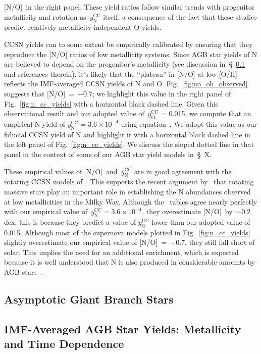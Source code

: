 \documentclass[ms.tex]{subfiles}
\begin{document}
[N/O]\subcc~in the right panel.
These yield ratios follow similar trends with progenitor metallicity and
rotation as~$y_\text{N}^\text{CC}$ itself, a consequence of the fact that these
studies predict relatively metallicity-independent O yields.
\par
CCSN yields can to some extent be empirically calibrated by ensuring that they
reproduce the [N/O] ratios of low metallicity systems.
Since AGB star yields of N are believed to depend on the progenitor's
metallicity (see discussion in~\S~\ref{sec:yields:agb} and references therein),
it's likely that the ``plateau'' in [N/O] at low [O/H] reflects the
IMF-averaged CCSN yields of N and O.
Fig.~\ref{fig:no_oh_observed} suggests that [N/O]\subcc~=~$-0.7$; we highlight
this value in the right panel of Fig.~\ref{fig:n_cc_yields} with a horizontal
black dashed line.
Given this observational result and our adopted value of~$y_\text{O}^\text{CC}$
= 0.015, we compute that an empirical N yield of
$y_\text{N}^\text{CC} = 3.6\times10^{-4}$ using equation~.
We adopt this value as our fiducial CCSN yield of N and highlight it with a
horizontal black dashed line in the left panel of Fig.~\ref{fig:n_cc_yields}.
We discuss the sloped dotted line in that panel in the context of some of our
AGB star yield models in~\S~X.
\par
These empirical values of [N/O]\subcc~and~$y_\text{N}^\text{CC}$ are in good
agreement with the rotating CCSN models of~\citet{Limongi2018}.
This supports the recent argument by~\citet{Grisoni2021} that rotating massive
stars play an important role in establishing the N abundances observed at low
metallicities in the Milky Way.
Although the~\citet{Sukhbold2016} tables agree nearly perfectly with our
empirical value of~$y_\text{N}^\text{CC} = 3.6\times10^{-4}$, they overestimate
[N/O]\subcc~by~$\sim$0.2 dex; this is because they predict a value of
$y_\text{O}^\text{CC}$ lower than our adopted value of 0.015.
Although most of the supernova models plotted in Fig.~\ref{fig:n_cc_yields}
slightly overestimate our empirical value of [N/O]\subcc~=~$-0.7$, they still
fall short of solar.
This implies the need for an additional enrichment, which is expected because
it is well understood that N is also produced in considerable amounts by
AGB stars~\citep{Johnson2019}.


\subsection{Asymptotic Giant Branch Stars}
\label{sec:yields:agb}

\subsection{IMF-Averaged AGB Star Yields: Metallicity and Time Dependence}
\label{sec:yields:imf_agb}
\end{document}
